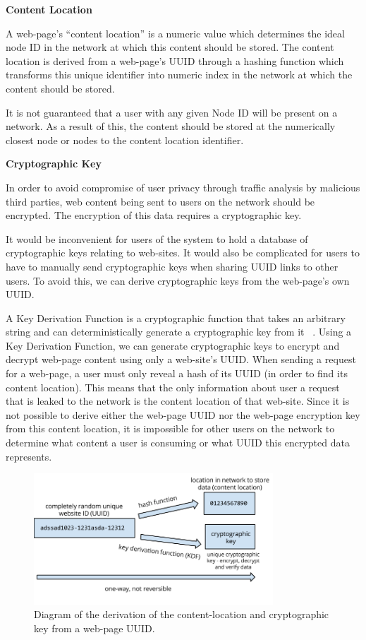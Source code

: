\textbf{Content Location}

A web-page's ``content location'' is a numeric value which determines the ideal node ID in the network at which this content
should be stored. The content location is derived from a web-page's UUID through a hashing function which transforms this unique
identifier into numeric index in the network at which the content should be stored.

It is not guaranteed that a user with any given Node ID will be present on a network. As a result of this, the content should be
stored at the numerically closest node or nodes to the content location identifier.

\textbf{Cryptographic Key}

In order to avoid compromise of user privacy through traffic analysis by malicious third parties, web content being sent to users
on the network should be encrypted. The encryption of this data requires a cryptographic key.

It would be inconvenient for users of the system to hold a database of cryptographic keys relating to web-sites. It would also be
complicated for users to have to manually send cryptographic keys when sharing UUID links to other users. To avoid this, we can
derive cryptographic keys from the web-page's own UUID.

A Key Derivation Function is a cryptographic function that takes an arbitrary string and can
deterministically generate a cryptographic key from it ~\cite{kdf}. Using a Key Derivation Function, we
can generate cryptographic keys to encrypt and decrypt web-page content using only a web-site's UUID.
When sending a request for a web-page, a user must only reveal a hash of its UUID (in order to
find its content location). This means that the only information about user a request that is leaked to the network
is the content location of that web-site. Since it is not possible to derive either the web-page UUID nor the web-page
encryption key from this content location, it is impossible for other users on the network to determine what content
a user is consuming or what UUID this encrypted data represents.

\begin{figure}[H]
    \centering
    \includegraphics[width=0.8\textwidth]{img/KDF-hashing-example.png}
    \caption{Diagram of the derivation of the content-location and cryptographic key from a web-page UUID.}
    \label{fig:kdf_hashing}
\end{figure}


